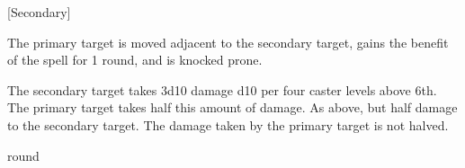 \begin{spellheader}
    \begin{spelltargetinginfo}
    \end{spelltargetinginfo}
    \begin{spelleffects}
        \begin{spelltargetinginfo}
            [Secondary]
        \end{spelltargetinginfo}
    \end{spelleffects}
\end{spellheader}
\begin{spellcontent}
    \spelleffect The primary target is moved adjacent to the secondary target, gains the benefit of the  spell for 1 round, and is knocked prone.
    \begin{spellmargin}
        \spellsuccess The secondary target takes 3d10 damage \add d10 per four caster levels above 6th. The primary target takes half this amount of damage.
        \spellfailure As above, but half damage to the secondary target. The damage taken by the primary target is not halved.
    \end{spellmargin}
     round
\end{spellcontent}
\begin{spellfooter}
\end{spellfooter}



